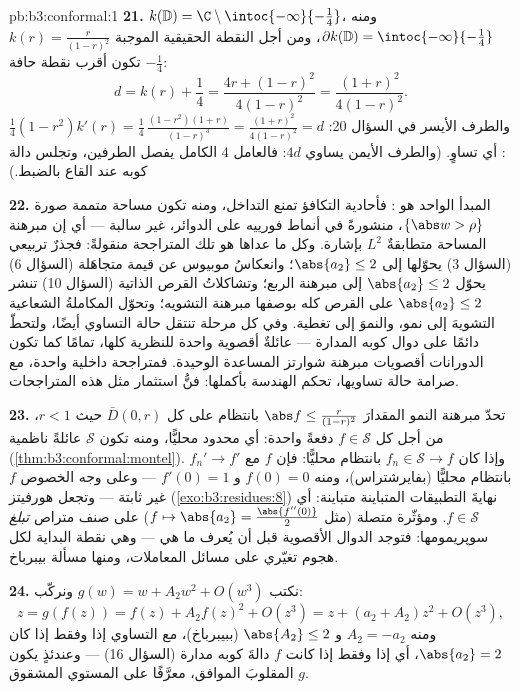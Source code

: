 \begin{solution}{pb:b3:conformal:1}
\textbf{21.} $k(\mathbb D) = \C\setminus
\intoc{-\infty}{-\frac14}$، ومنه $\partial k(\mathbb D) =
\intoc{-\infty}{-\frac14}$، ومن أجل النقطة الحقيقية
الموجبة $k(r) = \frac r{(1-r)^2}$ تكون أقرب نقطة حافة $-\frac14$:
\[
d = k(r) + \frac14 = \frac{4r + (1-r)^2}{4(1-r)^2}
= \frac{(1+r)^2}{4(1-r)^2} .
\]
والطرف الأيسر في السؤال 20: $\frac14(1 - r^2)k'(r) =
\frac14\,\frac{(1-r^2)(1+r)}{(1-r)^3} =
\frac{(1+r)^2}{4(1-r)^2} = d$: أي تساوٍ. (والطرف الأيمن
يساوي $4d$: فالعامل $4$ الكامل يفصل الطرفين، وتجلس دالة كوبه
عند القاع بالضبط.)

\textbf{22.} المبدأ الواحد هو : فأحادية التكافؤ تمنع
التداخل، ومنه تكون مساحة متممة صورة $\{\abs w > \rho\}$، منشورةً في أنماط
فورييه على الدوائر، غير سالبة --- أي إن مبرهنة المساحة متطابقةٌ
$L^2$ بإشارة. وكل ما عداها هو تلك المتراجحة منقولةً: فجذرٌ
تربيعي (السؤال 3) يحوّلها إلى $\abs{a_2} \leq 2$؛ وانعكاسُ موبيوس عن قيمة
متجاهَلة (السؤال 6) يحوّل $\abs{a_2} \leq 2$ إلى مبرهنة الربع؛ وتشاكلاتُ
القرص الذاتية (السؤال 10) تنشر $\abs{a_2}
\leq 2$ على القرص كله بوصفها
مبرهنة التشويه؛ وتحوّل المكاملةُ الشعاعية التشويهَ إلى نمو،
والنموَ إلى تغطية. وفي كل مرحلة تنتقل حالة التساوي أيضًا،
ولتحطّ دائمًا على دوال كوبه المدارة --- عائلةٌ أقصوية واحدة
للنظرية كلها، تمامًا كما تكون الدورانات أقصويات مبرهنة شوارتز
المساعدة الوحيدة. فمتراجحة داخلية واحدة، مع صرامة حالة تساويها،
تحكم الهندسة بأكملها:  فنُّ استثمار مثل هذه
المتراجحات.

\textbf{23.} تحدّ مبرهنة النمو المقدارَ $\abs f \leq
\frac{r}{(1-r)^2}$ بانتظام على كل
$\bar D(0, r)$ حيث $r <
1$، من أجل كل $f \in \mathcal S$ دفعةً واحدة: أي
محدود محليًّا، ومنه تكون $\mathcal S$ عائلةً ناظمية
(\cref{thm:b3:conformal:montel}). وإذا كان $f_n \in \mathcal S \to
f$ بانتظام محليًّا: فإن $f$
 مع $f_n' \to f'$ بانتظام محليًّا (بفايرشتراس)، ومنه
$f(0) = 0$ و $f'(0) = 1$ --- وعلى وجه الخصوص $f$ غير ثابتة ---
وتجعل هورفيتز (\cref{exo:b3:residues:8}) نهايةَ التطبيقات المتباينة
متباينة: أي $f \in \mathcal S$. ومؤثّرة متصلة (مثل $f \mapsto \abs{a_2} = \frac{\abs{f''(0)}}2$) على صنف متراص
\emph{تبلغ} سوپريمومها: فتوجد الدوال الأقصوية قبل أن يُعرف ما
هي --- وهي نقطة البداية لكل هجوم تغيّري على مسائل المعاملات،
ومنها مسألة بيبرباخ.

\textbf{24.} نكتب $g(w) = w + A_2w^2 + O(w^3)$ ونركّب:
\[
z = g(f(z)) = f(z) + A_2f(z)^2 + O(z^3)
= z + (a_2 + A_2)z^2 + O(z^3),
\]
ومنه $A_2 = -a_2$ و $\abs{A_2} \leq 2$ (ببيبرباخ)، مع التساوي إذا وفقط
إذا كان $\abs{a_2} = 2$، أي إذا وفقط إذا كانت $f$ دالةَ كوبه
مدارة (السؤال 16) --- وعندئذٍ يكون $g$ المقلوبَ الموافق،
معرَّفًا على المستوي المشقوق.


\end{solution}
